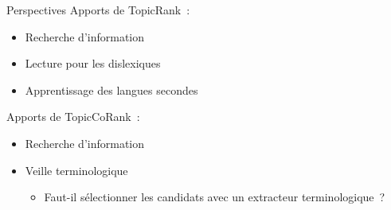   \begin{frame}{Perspectives}
    Apports de TopicRank~:
    \begin{itemize}
      \item{Recherche d'information~\cite{jones1999phrasier}}
      \item{Lecture pour les dislexiques~\cite{rello2014dislexia}}
      \item{Apprentissage des langues secondes~\cite{pressley1982mnemonickeywordmethod}}
    \end{itemize}

    \vspace{1em}

    Apports de TopicCoRank~:
    \begin{itemize}
      \item{Recherche d'information~\cite{jones1999phrasier}}
      \item{Veille terminologique}
      \begin{itemize}
        \item{Faut-il sélectionner les candidats avec un extracteur
              terminologique~?}
      \end{itemize}
    \end{itemize}
  \end{frame}

